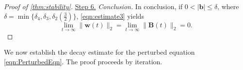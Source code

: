 \documentclass[10pt]{amsart}
\theoremstyle{plain}
\theoremstyle{definition}
\theoremstyle{remark}
\numberwithin{equation}{section}
\newcommand{\bb}{{\boldsymbol{b}}}
\newcommand{\bw}{{\boldsymbol{w}}}
\newcommand{\bB}{{\boldsymbol{B}}}
\begin{document}
\begin{proof}[Proof of \cref{thm:stability}]

\uline{Step 6.} \emph{Conclusion.} In conclusion, if $0<|\bb|\le \delta$, where $\delta=\min\{ \delta_4, \delta_3, \delta_2(\frac{3}{2})\}$, \cref{eqn:estimate3} yields
\[
\lim\limits_{t\to \infty}\|\bw(t)\|_2 
=\lim\limits_{t\to \infty} \|\bB(t)\|_2=0.
\]
\end{proof}


We now establish the decay estimate for the perturbed equation \cref{eqn:PerturbedEqn}. The proof proceeds by iteration.
\end{document}
